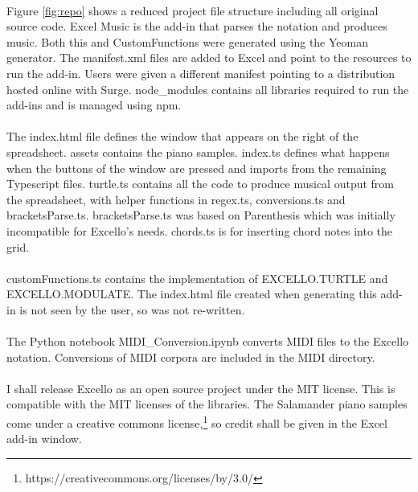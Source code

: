 \paragraph{} Figure \ref{fig:repo} shows a reduced project file structure including all original source code. Excel Music is the add-in that parses the notation and produces music. Both this and CustomFunctions were generated using the Yeoman generator. The manifest.xml files are added to Excel and point to the resources to run the add-in. Users were given a different manifest pointing to a distribution hosted online with Surge. node\_modules contains all libraries required to run the add-ins and is managed using npm.

\paragraph{} The index.html file defines the window that appears on the right of the spreadsheet. assets contains the piano samples. index.ts defines what happens when the buttons of the window are pressed and imports from the remaining Typescript files. turtle.ts contains all the code to produce musical output from the spreadsheet, with helper functions in regex.ts, conversions.ts and bracketsParse.ts. bracketsParse.ts was based on Parenthesis which was initially incompatible for Excello's needs. chords.ts is for inserting chord notes into the grid.

\paragraph{} customFunctions.ts contains the implementation of EXCELLO.TURTLE and EXCELLO.MODULATE. The index.html file created when generating this add-in is not seen by the user, so was not re-written.

\paragraph{} The Python notebook MIDI\_Conversion.ipynb converts MIDI files to the Excello notation. Conversions of MIDI corpora are included in the MIDI directory.

\paragraph{} I shall release Excello as an open source project under the MIT license. This is compatible with the MIT licenses of the libraries. The Salamander piano samples come under a creative commons license,\footnote{https://creativecommons.org/licenses/by/3.0/} so credit shall be given in the Excel add-in window.
